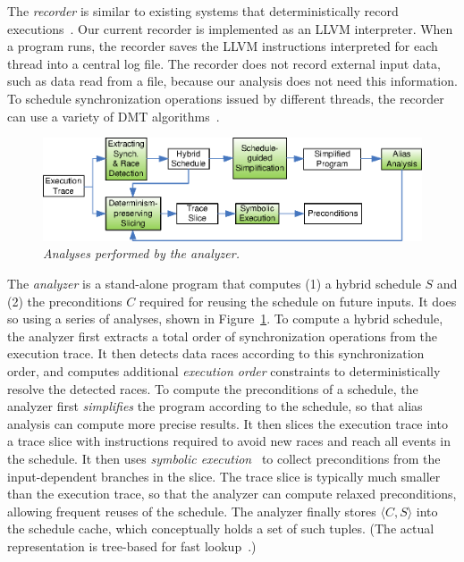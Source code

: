 The \emph{recorder} is similar to existing systems that deterministically
record executions~\cite{scribe:sigmetrics10,idna:vee06,smp-revirt:vee08}.
Our current recorder is implemented as an LLVM interpreter.  When a
program runs, the recorder saves the LLVM instructions interpreted for
each thread into a central log file.  The recorder does not record
external input data, such as data read from a file, because our
analysis does not need this information.  To schedule synchronization
operations issued by different threads, the recorder can use a variety of
DMT algorithms~\cite{cui:tern:osdi10}.  


\begin{figure}
\centering
\includegraphics[width=\columnwidth]{peregrine/figures/analyzer.eps}
\caption{{\em Analyses performed by the analyzer.}}\label{fig:analyzer}
\end{figure}

The \emph{analyzer} is a stand-alone program that computes (1) a hybrid
schedule $S$ and (2) the preconditions $C$ required for reusing the schedule on
future inputs.  It does so using a series of analyses, shown in
Figure~\ref{fig:analyzer}.  To compute a hybrid schedule, the analyzer
first extracts a total order of synchronization operations from the
execution trace.  It then detects data races according to this
synchronization order, and computes additional \emph{execution order} constraints
to deterministically resolve the detected races.
To compute the preconditions of a schedule, the analyzer first
\emph{simplifies} the program according to the schedule, so that alias
analysis can compute more precise results.  
It then slices the execution trace into a trace slice with instructions
required to avoid new races and reach all events in the schedule.  It
then uses \emph{symbolic execution}~\cite{symbolic-execution} to
collect preconditions from the input-dependent branches in the slice.
The trace slice is typically much smaller than the execution trace, so
that the analyzer can compute relaxed preconditions, allowing frequent
reuses of the schedule.  The analyzer finally stores $\langle C, S
\rangle$ into the schedule cache, which conceptually holds a set of such
tuples. (The actual representation is tree-based for fast
lookup~\cite{cui:tern:osdi10}.)


